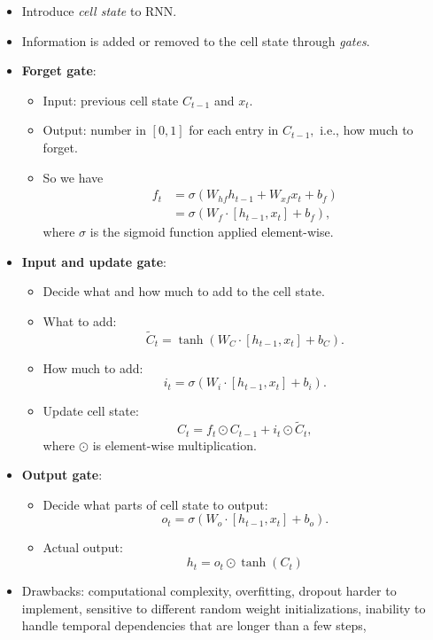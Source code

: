 \documentclass[../ds]{subfiles}
\begin{document}
\begin{itemize}
\item 
Introduce \textit{cell state} to RNN.

\item
Information is added or removed to the cell state through \textit{gates}.

\item 
\textbf{Forget gate}:
	\begin{itemize}
	\item Input: previous cell state $C_{t-1}$ and $x_t.$
	\item Output: number in $[0,1]$ for each entry in $C_{t-1},$ i.e., how much to forget.
	\item So we have
		\begin{align*}
		f_t &=  \sigma(W_{hf}h_{t-1} + W_{xf}x_t + b_f)\\
		    &=\sigma ( W_f \cdot [h_{t-1}, x_t] + b_f),
		\end{align*}
	where $\sigma$ is the sigmoid function applied element-wise.
	\end{itemize}

\item 
\textbf{Input and update gate}:
	\begin{itemize}
	\item 
	Decide what and how much to add to the cell state.
	
	\item 
	What to add: \[ \tilde{C}_t = \tanh(W_C \cdot [h_{t-1}, x_t] + b_C). \]
	
	\item 
	How much to add: \[ i_t = \sigma(W_i \cdot [h_{t-1}, x_t] + b_i). \]
	
	\item 
	Update cell state: \[ C_t = f_t \odot C_{t-1} + i_t \odot \tilde{C}_t, \] where $\odot$ is element-wise multiplication.
	\end{itemize}

\item 
\textbf{Output gate}:
	\begin{itemize}
	\item 
	Decide what parts of cell state to output: \[ o_t = \sigma(W_o \cdot [h_{t-1}, x_t] + b_o). \]
	
	\item 
	Actual output: \[ h_t = o_t \odot \tanh(C_t) \]
	\end{itemize}

\item 
Drawbacks: computational complexity, overfitting, dropout harder to implement, sensitive to different random weight initializations, inability to handle temporal dependencies that are longer than a few steps, 

\end{itemize}
\end{document}
